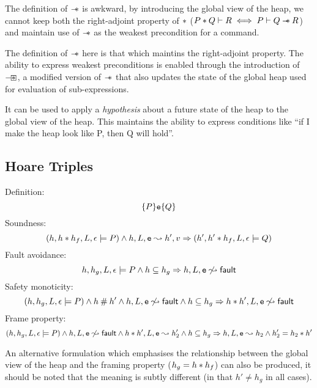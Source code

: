 \documentclass[a4paper]{article}
\begin{document}
The definition of $\mathbin{-\mkern-6mu *}$ is awkward, by introducing the global view of the
heap, we cannot keep both the right-adjoint property of $\mathbin{*}$
($P \mathbin{*} Q \vdash R \iff P \vdash Q \mathbin{-\mkern-6mu *} R$)
and maintain use of $\mathbin{-\mkern-6mu *}$ as the weakest precondition for a command.

The definition of $\mathbin{-\mkern-6mu *}$ here is that which maintins the right-adjoint property. The
ability to express weakest preconditions is enabled through the introduction
of $\mathbin{-\mkern-3mu \boxast}$, a modified version of $\mathbin{-\mkern-6mu *}$ that also updates the state of the
global heap used for evaluation of sub-expressions.

It can be used to apply
a \emph{hypothesis} about a future state of the heap to the global view of the
heap. This maintains the ability to express conditions like ``if I make
the heap look like P, then Q will hold''.

\subsection{Hoare Triples}
Definition:
\[ \{P\}\mbox{\texttt{{\upshape e}}}\{Q\} \]
Soundness:
\[ (h, h \mathbin{*} h_f, L, \epsilon \models P) \land h, L, \mbox{\texttt{{\upshape e}}} \leadsto h', v
  \Rightarrow (h', h' \mathbin{*} h_f, L, \epsilon \models Q) \]
Fault avoidance:
\[ h, h_g, L, \epsilon \models P \land h\subseteq h_g \Rightarrow h, L, \mbox{\texttt{{\upshape e}}} \not\leadsto {\ensuremath{\mathsf{fault}}} \]
Safety monoticity:
\[ (h, h_g, L, \epsilon \models P) \land h \mathbin{\#} h' \land h, L, \mbox{\texttt{{\upshape e}}} \not\leadsto
  {\ensuremath{\mathsf{fault}}} \land h\subseteq h_g \Rightarrow h \mathbin{*} h', L, \mbox{\texttt{{\upshape e}}} \not\leadsto {\ensuremath{\mathsf{fault}}} \]
Frame property:
\[ (h, h_g, L, \epsilon \models P) \land h, L, \mbox{\texttt{{\upshape e}}} \not\leadsto {\ensuremath{\mathsf{fault}}} \land
  h \mathbin{*} h', L, \mbox{\texttt{{\upshape e}}} \leadsto h_2' \land h\subseteq h_g\Rightarrow h, L, \mbox{\texttt{{\upshape e}}} \leadsto h_2 \land
  h_2' = h_2 \mathbin{*} h' \]

An alternative formulation which emphasises the relationship between the global
view of the heap and the framing property ($h_g = h \mathbin{*} h_f$) can also be
produced, it should be noted that the meaning is subtly different (in that $h'
\neq h_g$ in all cases).
\end{document}
